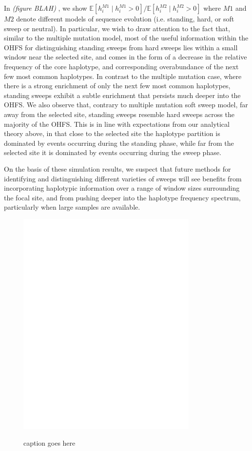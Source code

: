 \documentclass[a4paper,10pt]{article}
\newcommand{\jb}[1]{{\it\color{blue} (#1)} }
\begin{document}
In \jb{figure BLAH}, we show $\mathbb{E}[h_i^{M1} \mid h_i^{M1} > 0]/\mathbb{E}[h_i^{M2} \mid h_i^{M2} > 0]$ where $M1$ and $M2$ denote different models of sequence evolution (i.e. standing, hard, or soft sweep or neutral). In particular, we wish to draw attention to the fact that, similar to the multiple mutation model, most of the useful information within the OHFS for distinguishing standing sweeps from hard sweeps lies within a small window near the selected site, and comes in the form of a decrease in the relative frequency of the core haplotype, and corresponding overabundance of the next few most common haplotypes. In contrast to the multiple mutation case, where there is a strong enrichment of only the next few most common haplotypes, standing sweeps exhibit a subtle enrichment that persists much deeper into the OHFS. We also observe that, contrary to multiple mutation soft sweep model, far away from the selected site, standing sweeps resemble hard sweeps across the majority of the OHFS. This is in line with expectations from our analytical theory above, in that close to the selected site the haplotype partition is dominated by events occurring during the standing phase, while far from the selected site it is dominated by events occurring during the sweep phase.

On the basis of these simulation results, we suspect that future methods for identifying and distinguishing different varieties of sweeps will see benefits from incorporating haplotypic information over a range of window sizes surrounding the focal site, and from pushing deeper into the haplotype frequency spectrum, particularly when large samples are available.

\begin{figure}
	\includegraphics[width = 0.8\textwidth]{../Paper_Figures/HapFreqRatiosCondExist.pdf} \label{cartoon_3_kinds}
	\caption{caption goes here}
\end{figure}
\end{document}
